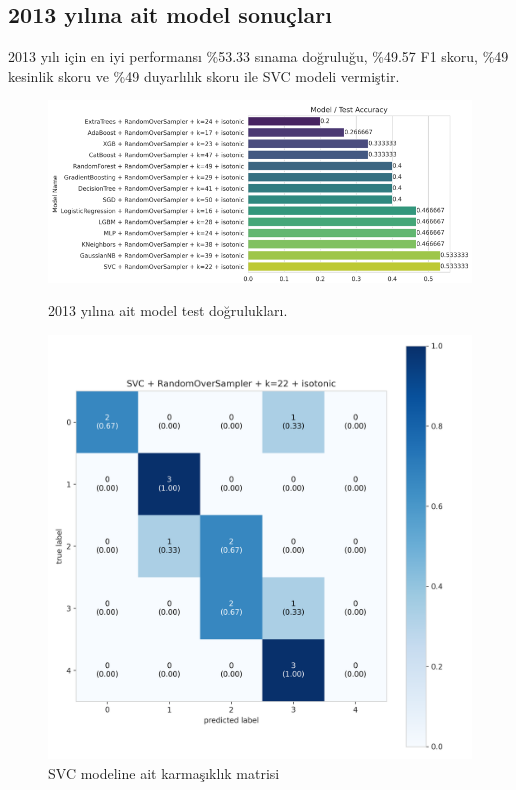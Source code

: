 \newpage

\subsection{2013 yılına ait model sonuçları}
2013 yılı için en iyi performansı \%53.33 sınama doğruluğu,  \%49.57 F1 skoru, \%49 kesinlik skoru ve \%49 duyarlılık skoru ile SVC modeli vermiştir.

\begin{figure}[ht]
\centering
\begin{minipage}[b]{0.6\textwidth}
    \centering
    \includegraphics[width=\textwidth]{2013.png}
    \caption{2013 yılına ait model test doğrulukları.}
    \label{fig:resim1}
\end{minipage}
\hfill
\begin{minipage}[b]{0.6\textwidth}
    \centering
    \includegraphics[width=\textwidth]{2013_cm.png}
    \caption{SVC modeline ait karmaşıklık matrisi}
    \label{fig:resim2}
\end{minipage}
\end{figure}

